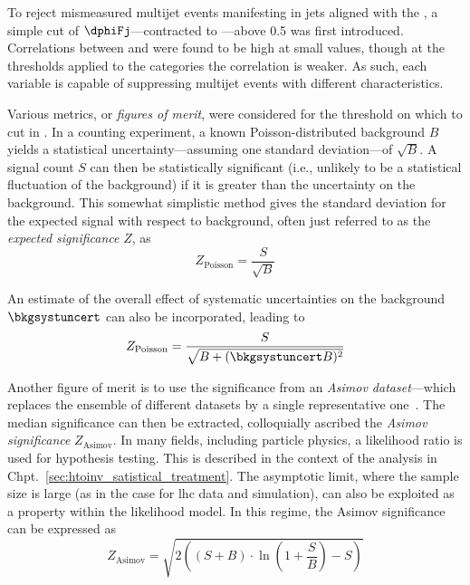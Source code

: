 To reject mismeasured multijet events manifesting in \glspl{jet} aligned with the \ptvecmiss, a simple cut of $\dphiFj$---contracted to \mindphi---above 0.5 was first introduced. Correlations between \mindphi and \omegaTilde were found to be high at small values, though at the thresholds applied to the categories the correlation is weaker. As such, each variable is capable of suppressing multijet events with different characteristics.

Various metrics, or \emph{figures of merit}, were considered for the threshold on which to cut in \omegaTilde. In a counting experiment, a known Poisson-distributed background $B$ yields a statistical uncertainty---assuming one standard deviation---of $\sqrt{B}$. A signal count $S$ can then be statistically significant (i.e., unlikely to be a statistical fluctuation of the background) if it is greater than the uncertainty on the background. This somewhat simplistic method gives the standard deviation for the expected signal with respect to background, often just referred to as the \emph{expected significance} $Z$, as
\begin{equation}
Z_{\mathrm{Poisson}} = \frac{S}{\sqrt{B}}
\label{eq:s_over_root_b}
\end{equation}

An estimate of the overall effect of systematic uncertainties on the background $\bkgsystuncert$ can also be incorporated, leading to
\begin{equation}
Z_{\mathrm{Poisson}} = \frac{S}{\sqrt{B + (\bkgsystuncert B)^2}}
\label{eq:s_over_root_b_systs}
\end{equation}

Another figure of merit is to use the significance from an \emph{Asimov dataset}---which replaces the ensemble of different datasets by a single representative one~\cite{Cowan:2010js}. The median significance can then be extracted, colloquially ascribed the \emph{Asimov significance} $Z_{\mathrm{Asimov}}$. In many fields, including particle physics, a likelihood ratio is used for hypothesis testing. This is described in the context of the analysis in Chpt.~\ref{sec:htoinv_satistical_treatment}. The asymptotic limit, where the sample size is large (as in the case for \acrshort{lhc} data and simulation), can also be exploited as a property within the likelihood model. In this regime, the Asimov significance can be expressed as
\begin{equation}
Z_{\mathrm{Asimov}} = \sqrt{2 \left( (S + B) \cdot \ln\left(1 + \frac{S}{B} \right) - S \right)}
\label{eq:asimov_significance}
\end{equation}

